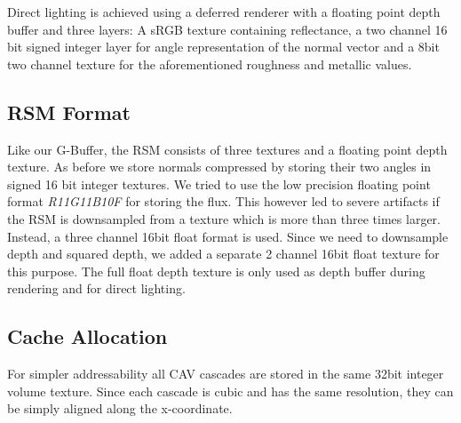 \documentclass[thesis.tex]{subfiles}
\begin{document}
Direct lighting is achieved using a deferred renderer with a floating point depth buffer and three layers:
A sRGB texture containing reflectance, a two channel 16\,bit signed integer layer for angle representation of the normal vector and a 8bit two channel texture for the aforementioned roughness and metallic values.

\subsection{RSM Format}
Like our G-Buffer, the RSM consists of three textures and a floating point depth texture.
As before we store normals compressed by storing their two angles in signed 16 bit integer textures.
We tried to use the low precision floating point format \emph{R11G11B10F} for storing the flux.
This however led to severe artifacts if the RSM is downsampled from a texture which is more than three times larger.
Instead, a three channel 16bit float format is used.
Since we need to downsample depth and squared depth, we added a separate 2 channel 16bit float texture for this purpose.
The full float depth texture is only used as depth buffer during rendering and for direct lighting.

\subsection{Cache Allocation} \label{sec:impl:cachealloc}
For simpler addressability all CAV cascades are stored in the same 32bit integer volume texture.
Since each cascade is cubic and has the same resolution, they can be simply aligned along the x-coordinate.
\end{document}
